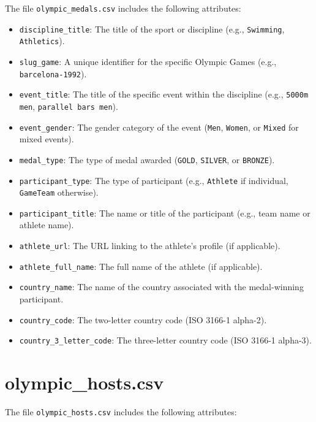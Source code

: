 The file \texttt{olympic\_medals.csv} includes the following attributes:

\begin{itemize}
    \item \texttt{discipline\_title}: The title of the sport or discipline (e.g., \texttt{Swimming}, \texttt{Athletics}).
    \item \texttt{slug\_game}: A unique identifier for the specific Olympic Games (e.g., \texttt{barcelona-1992}).
    \item \texttt{event\_title}: The title of the specific event within the discipline (e.g., \texttt{5000m men}, \texttt{parallel bars men}).
    \item \texttt{event\_gender}: The gender category of the event (\texttt{Men}, \texttt{Women}, or \texttt{Mixed} for mixed events).
    \item \texttt{medal\_type}: The type of medal awarded (\texttt{GOLD}, \texttt{SILVER}, or \texttt{BRONZE}).
    \item \texttt{participant\_type}: The type of participant (e.g., \texttt{Athlete} if individual, \texttt{GameTeam} otherwise).
    \item \texttt{participant\_title}: The name or title of the participant (e.g., team name or athlete name).
    \item \texttt{athlete\_url}: The URL linking to the athlete's profile (if applicable).
    \item \texttt{athlete\_full\_name}: The full name of the athlete (if applicable).
    \item \texttt{country\_name}: The name of the country associated with the medal-winning participant.
    \item \texttt{country\_code}: The two-letter country code (ISO 3166-1 alpha-2).
    \item \texttt{country\_3\_letter\_code}: The three-letter country code (ISO 3166-1 alpha-3).
\end{itemize}

\section{olympic\_hosts.csv}

The file \texttt{olympic\_hosts.csv} includes the following attributes:

